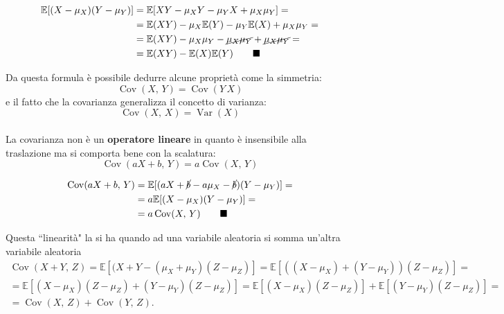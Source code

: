 \begin{dimostrazione}[$\E{[}(X-\mu_X)(Y-\mu_Y){]} = \E(X Y) - \E(X)\E(Y)$]
\begin{align*}
    \mathbb{E}[(X-\mu_X)(Y-\mu_Y)] &= \mathbb{E}[X Y - \mu_X Y - \mu_Y X + \mu_X \mu_Y] = \\
    &= \mathbb{E}(X Y) - \mu_X \mathbb{E}(Y) - \mu_Y \mathbb{E}(X) + \mu_X \mu_Y = \\
    &= \mathbb{E}(X Y) - \mu_X \mu_Y - \cancel{\mu_X \mu_Y} + \cancel{\mu_X \mu_Y} = \\
    &= \mathbb{E}(X Y) - \mathbb{E}(X) \mathbb{E}(Y) \tag*{$\blacksquare$}
\end{align*}
\end{dimostrazione}
\noindent Da questa formula è possibile dedurre alcune proprietà come la simmetria:
$$\operatorname{Cov}(X, \, Y) = \operatorname{Cov}(Y \, X)$$
\noindent e il fatto che la covarianza generalizza il concetto di varianza:
$$\operatorname{Cov}(X, \, X) = \operatorname{Var}(X)$$ \\
\noindent La covarianza non è un \textbf{operatore lineare} in quanto è insensibile alla traslazione ma si comporta bene con la scalatura: \[
\operatorname{Cov}(aX + b, \, Y) = a\operatorname{Cov}(X, \, Y)
\]

\begin{dimostrazione}
\begin{align*}
    \operatorname{Cov}(aX + b, \, Y) &= \mathbb{E}[(aX +\cancel{b} -a\mu_X -\cancel{b})(Y-\mu_Y)] = \\
    &= a \mathbb{E}[(X-\mu_X)(Y-\mu_Y)] = \\
    &= a \operatorname{Cov}(X, \, Y) \tag*{$\blacksquare$}
\end{align*}
\end{dimostrazione}

\noindent Questa ``linearità" la si ha quando ad una variabile aleatoria si somma un'altra variabile aleatoria
\begin{align*}
    \operatorname{Cov}(X+Y, \, Z) = \mathbb{E}[(X+Y - (\mu_X + \mu_Y)(Z - \mu_Z)] = \mathbb{E}[((X-\mu_X) + (Y - \mu_Y))(Z - \mu_Z)] = \\ = \mathbb{E}[(X - \mu_X)(Z - \mu_Z) + (Y - \mu_Y)(Z - \mu_Z)] = \mathbb{E}[(X - \mu_X)(Z - \mu_Z)] + \mathbb{E}[(Y - \mu_Y)(Z - \mu_Z)] = \\ = \operatorname{Cov}(X, \,Z) + \operatorname{Cov}(Y,\,Z).
\end{align*}

